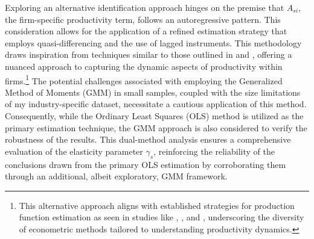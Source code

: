 Exploring an alternative identification approach hinges on the premise that $A_{si}$, the firm-specific productivity term, follows an autoregressive pattern. This consideration allows for the application of a refined estimation strategy that employs quasi-differencing and the use of lagged instruments. This methodology draws inspiration from techniques similar to those outlined in \cite{blundell2000gmm} and \cite{davis2014macroeconomic}, offering a nuanced approach to capturing the dynamic aspects of productivity within firms.\footnote{
This alternative approach aligns with established strategies for production function estimation as seen in studies like \cite{olley1992dynamics}, \cite{levinsohn2003estimating}, and \cite{ackerberg2015identification}, underscoring the diversity of econometric methods tailored to understanding productivity dynamics.
} The potential challenges associated with employing the Generalized Method of Moments (GMM) in small samples, coupled with the size limitations of my industry-specific dataset, necessitate a cautious application of this method. Consequently, while the Ordinary Least Squares (OLS) method is utilized as the primary estimation technique, the GMM approach is also considered to verify the robustness of the results. This dual-method analysis ensures a comprehensive evaluation of the elasticity parameter $\gamma_s$, reinforcing the reliability of the conclusions drawn from the primary OLS estimation by corroborating them through an additional, albeit exploratory, GMM framework.